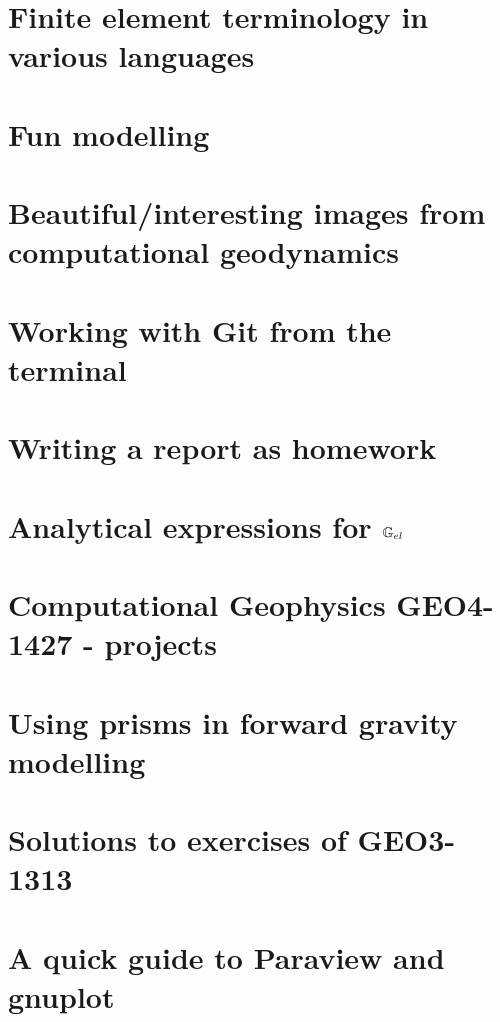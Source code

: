 \documentclass[a4paper,12pt]{report}
\begin{document}
\chapter{Finite element terminology in various languages}  %
\chapter{Fun modelling}  %
\chapter{Beautiful/interesting images from computational geodynamics} %
\chapter{Working with Git from the terminal}  %
\chapter{Writing a report as homework \label{app:grading}}  %
\chapter{Analytical expressions for ${\mathbb{G}}_{el}$} \label{app:Gel}  %
\chapter{Computational Geophysics GEO4-1427 - projects}  %
\chapter{Using prisms in forward gravity modelling \label{app:prisms}}  %
\chapter{Solutions to exercises of GEO3-1313 \label{app:gravsols}}  %
\chapter{A quick guide to Paraview and gnuplot \label{app:plot}}  
\end{document}
